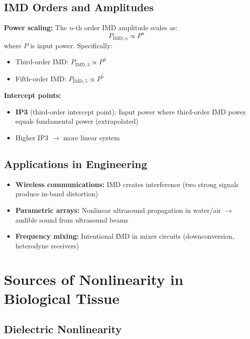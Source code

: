 \subsection{IMD Orders and Amplitudes}

\textbf{Power scaling:} The $n$-th order IMD amplitude scales as:
\begin{equation}
\label{eq:imd-power-scaling}
P_{\text{IMD},n} \propto P^n
\end{equation}
where $P$ is input power. Specifically:
\begin{itemize}
\item Third-order IMD: $P_{\text{IMD},3} \propto P^3$
\item Fifth-order IMD: $P_{\text{IMD},5} \propto P^5$
\end{itemize}

\textbf{Intercept points:}
\begin{itemize}
\item \textbf{IP3} (third-order intercept point): Input power where third-order IMD power equals fundamental power (extrapolated)
\item Higher IP3 $\rightarrow$ more linear system
\end{itemize}

\subsection{Applications in Engineering}

\begin{itemize}
\item \textbf{Wireless communications:} IMD creates interference (two strong signals produce in-band distortion)
\item \textbf{Parametric arrays:} Nonlinear ultrasound propagation in water/air $\rightarrow$ audible sound from ultrasound beams
\item \textbf{Frequency mixing:} Intentional IMD in mixer circuits (downconversion, heterodyne receivers)
\end{itemize}

\section{Sources of Nonlinearity in Biological Tissue}

\subsection{Dielectric Nonlinearity}

